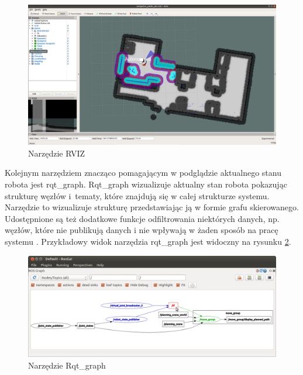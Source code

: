 \begin{figure}[!h]
    \centering
    \includegraphics[width=0.95\linewidth]{img/ros_tools_rviz.png} 
    \caption{Narzędzie RVIZ \cite{b_site_ROS_tools}} 
     \label{f_ros_tools_rviz}
    \end{figure}

Kolejnym narzędziem znacząco pomagającym w podglądzie aktualnego stanu robota jest rqt\_graph. Rqt\_graph wizualizuje aktualny stan robota pokazując strukturę węzłów i~tematy, które znajdują się w całej strukturze systemu. Narzędzie to wizualizuje strukturę przedstawiając ją w formie grafu skierowanego. Udostępnione są też dodatkowe funkcje odfiltrowania niektórych danych, np. węzłów, które nie publikują danych i nie wpływają w żaden sposób na pracę systemu \cite{b_site_ROS_tools}. Przykładowy widok narzędzia rqt\_graph jest widoczny na rysunku \ref{f_ros_tools_rqt}.


    \begin{figure}[!h]
    
    \centering
    \includegraphics[width=0.95\linewidth]{img/ros_tools_rqt.png}
    \caption{Narzędzie Rqt\_graph \cite{b_site_ROS_tools}} 
     \label{f_ros_tools_rqt}

\end{figure}

